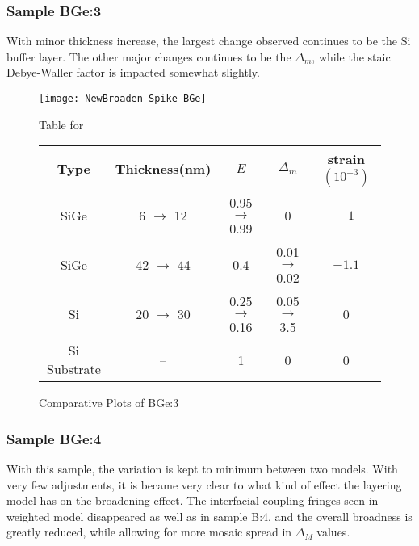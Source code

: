 \subsubsection{Sample BGe:3}

With minor thickness increase, the largest change observed continues to be the Si buffer layer.  The other major changes continues to be the $\Delta_m$, while the staic Debye-Waller factor is impacted somewhat slightly.

\begin{figure}[ht]%
\caption{Comparative Plots of BGe:3}
\label{NBGe3:fig}
\begin{minipage}{\linewidth}
\texttt{[image: NewBroaden-Spike-BGe]}
\end{minipage}
\begin{minipage}{\linewidth}
\centering
\vspace{10pt}
Table for \\
\begin{tabular}[htbp]{@{}c|cccc@{}}
    \hline
  Type & Thickness(nm) & $E$ & $\Delta_m$ & strain $(10^{-3})$ \\
    \hline
  SiGe & 6   $\rightarrow$ 12 & 0.95  $\rightarrow$ 0.99 &0& $-1$  \\
  SiGe & 42   $\rightarrow$ 44 & 0.4 & 0.01  $\rightarrow$ 0.02 & $-1 .1$  \\
Si	& 20  $\rightarrow$ 30	& 0.25  $\rightarrow$ 0.16& 0.05  $\rightarrow$ 3.5& 0\\
  Si Substrate & -- & 1 & 0 & 0 
  \end{tabular}
\end{minipage}
\end{figure}

\subsubsection{Sample BGe:4}

With this sample, the variation is kept to minimum between two models.   With very few adjustments, it is became very clear to what kind of effect the layering model has on the broadening effect.  The interfacial coupling fringes seen in weighted model disappeared as well as in sample B:4, and the overall broadness is greatly reduced, while allowing for more mosaic spread in $\Delta_M$ values.  

